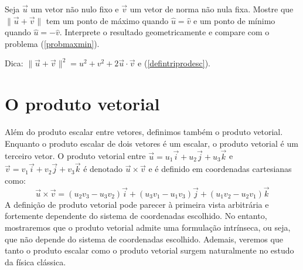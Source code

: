 \begin{exer}Seja $\vec{u}$ um vetor não nulo fixo e $\vec{v}$ um vetor de norma não nula fixa. Mostre que $\|\vec{u}+\vec{v}\|$ tem um ponto de máximo quando $\hat{u}=\hat{v}$ e um ponto de mínimo quando $\hat{u}=-\hat{v}$. Interprete o resultado geometricamente e compare com o problema (\ref{probmaxmin}).
\end{exer}
 Dica: $\|\vec{u}+\vec{v}\|^2=u^2+v^2+2\vec{u}\cdot\vec{v}$ e (\ref{defintriprodesc}).


\section{O produto vetorial}
Além do produto escalar entre vetores, definimos também o produto vetorial. Enquanto o produto escalar de dois vetores é um escalar, o produto vetorial é um terceiro vetor. O produto vetorial entre $\vec{u}=u_1\vec{i}+u_2\vec{j}+u_3\vec{k}$ e $\vec{v}=v_1\vec{i}+v_2\vec{j}+v_3\vec{k}$ é denotado $\vec{u}\times\vec{v}$ e é definido em coordenadas cartesianas como:
\begin{equation}\label{defprodvec} \vec{u}\times\vec{v}=\left(u_2v_3-u_3v_2\right)\vec{i}+\left(u_3v_1-u_1v_3\right)\vec{j}+\left(u_1v_2-u_2v_1\right)\vec{k}
\end{equation}
A definição de produto vetorial pode parecer à primeira vista arbitrária e fortemente dependente do sistema de coordenadas escolhido. No entanto, mostraremos que  o produto vetorial admite uma formulação intrínseca, ou seja, que não depende do sistema de coordenadas escolhido. Ademais, veremos que tanto o produto escalar como o produto vetorial surgem naturalmente no estudo da física clássica.

